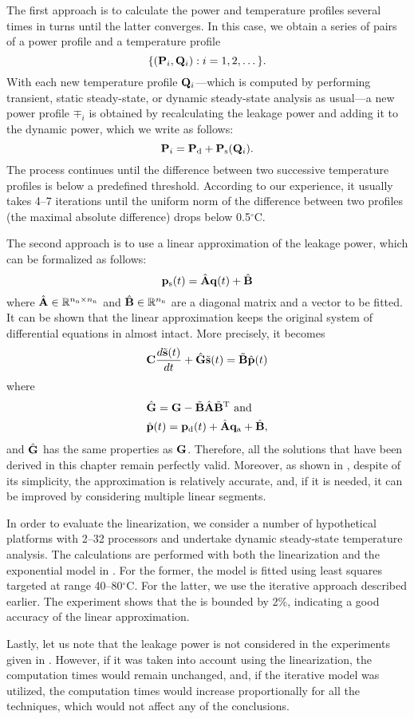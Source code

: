 The first approach is to calculate the power and temperature profiles several
times in turns until the latter converges. In this case, we obtain a series of
pairs of a power profile and a temperature profile
\[
  \{ (\mathbf{P}_i, \mathbf{Q}_i): i = 1, 2, \dots \}.
\]
With each new temperature profile $\mathbf{Q}_i$---which is computed by performing
transient, static steady-state, or dynamic steady-state analysis as usual---a
new power profile $\mp_i$ is obtained by recalculating the leakage power and
adding it to the dynamic power, which we write as follows:
\[
  \mathbf{P}_i = \mathbf{P}_{\mathrm{d}} + \mathbf{P}_{\mathrm{s}}(\mathbf{Q}_i).
\]
The process continues until the difference between two successive temperature
profiles is below a predefined threshold. According to our experience, it
usually takes 4--7 iterations until the uniform norm of the difference between
two profiles (the maximal absolute difference) drops below 0.5${}^\circ$C.

The second approach is to use a linear approximation of the leakage power, which
can be formalized as follows:
\[
  \mathbf{p}_{\mathrm{s}}(t) = \hat{\mathbf{A}} \mathbf{q}(t) + \hat{\mathbf{B}}
\]
where $\hat{\mathbf{A}} \in \mathbb{R}^{{n_\mathrm{n}} \times {n_\mathrm{n}}}$ and $\hat{\mathbf{B}} \in \mathbb{R}^{n_\mathrm{n}}$ are a
diagonal matrix and a vector to be fitted. It can be shown that the linear
approximation keeps the original system of differential equations in
 almost intact. More precisely, it
becomes
\[
  \mathbf{C} \frac{d\tilde{\mathbf{s}}(t)}{dt} + \hat{\mathbf{G}} \tilde{\mathbf{s}}(t) = \tilde{\mathbf{B}} \hat{\mathbf{p}}(t)
\]
where
\begin{align*}
  & \hat{\mathbf{G}} = \mathbf{G} - \tilde{\mathbf{B}} \hat{\mathbf{A}} {\tilde{\mathbf{B}}}^\mathrm{T} \text{ and} \\
  & \hat{\mathbf{p}}(t) = \mathbf{p}_{\mathrm{d}}(t) + \hat{\mathbf{A}} \mathbf{q}_{\mathrm{a}} + \hat{\mathbf{B}},
\end{align*}
and $\hat{\mathbf{G}}$ has the same properties as $\mathbf{G}$. Therefore, all the solutions
that have been derived in this chapter remain perfectly valid. Moreover, as
shown in \cite{liu2007}, despite of its simplicity, the approximation is
relatively accurate, and, if it is needed, it can be improved by considering
multiple linear segments.

In order to evaluate the linearization, we consider a number of hypothetical
platforms with 2--32 processors and undertake dynamic steady-state temperature
analysis. The calculations are performed with both the linearization and the
exponential model in . For the former, the model is fitted
using least squares \cite{press2007} targeted at range 40--80${}^\circ$C. For
the latter, we use the iterative approach described earlier. The experiment
shows that the  is bounded by 2\%, indicating a good accuracy of the
linear approximation.

Lastly, let us note that the leakage power is not considered in the experiments
given in . However, if it was taken into
account using the linearization, the computation times would remain unchanged,
and, if the iterative model was utilized, the computation times would increase
proportionally for all the techniques, which would not affect any of the
conclusions.
